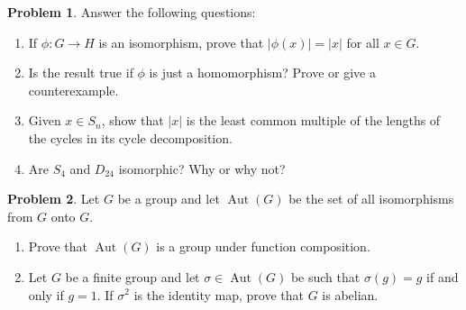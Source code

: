 \documentclass[letterpaper,11pt]{amsart}
\theoremstyle{plain}
\theoremstyle{definition}
\newtheorem{pr}{Problem}
\theoremstyle{remark}
\DeclareMathOperator{\aut}{Aut}
\begin{document}
\begin{pr}
    Answer the following questions:
    \begin{enumerate}
        \item If $\phi: G\rightarrow H$ is an isomorphism, prove that $|\phi(x)| = |x|$ for all $x \in G$.
        \item Is the result true if $\phi$ is just a homomorphism? Prove or give a counterexample.
        \item Given $x \in S_n$, show that $|x|$ is the least common multiple of the lengths of the cycles in its cycle decomposition.
        \item Are $S_4$ and $D_{24}$ isomorphic? Why or why not?
    \end{enumerate}
\end{pr}

\begin{pr}
    Let $G$ be a group and let $\aut(G)$ be the set of all isomorphisms from $G$ onto $G$.
    \begin{enumerate}
        \item Prove that $\aut(G)$ is a group under function composition.
        \item Let $G$ be a finite group and let $\sigma \in \aut(G)$ be such that $\sigma(g) = g$ if and only if $g = 1$. If $\sigma^2$ is the identity map, prove that $G$ is abelian.
    \end{enumerate}
\end{pr}
\end{document}
